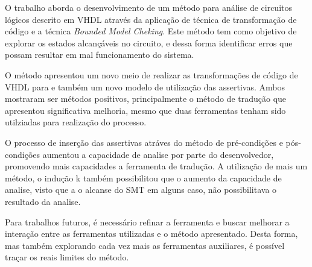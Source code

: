 \label{chapter:consideracoes}
O trabalho aborda o desenvolvimento de um método para análise de circuitos lógicos descrito em VHDL através da aplicação de técnica de transformação de código e a técnica \textit{Bounded Model Cheking}. Este método tem como objetivo de explorar os estados alcançáveis no circuito, e dessa forma identificar erros que possam resultar em mal funcionamento do sistema.

\par
O método apresentou um novo meio de realizar as transformações de código de VHDL para e também um novo modelo de utilização das assertivas. Ambos mostraram ser métodos positivos, principalmente o método de tradução que apresentou significativa melhoria, mesmo que duas ferramentas tenham sido utilziadas para realização do processo.

\par
O processo de inserção das assertivas atráves do método de pré-condições e pós-condições aumentou a capacidade de analise por parte do desenvolvedor, promovendo mais capacidades a ferramenta de tradução. A utilização de mais um método, o indução k também possibilitou que o aumento da capacidade de analise, visto que a o alcanse do SMT em alguns caso, não possibilitava o resultado da analise.

\par
Para trabalhos futuros, é necessário refinar a ferramenta e buscar melhorar a interação entre as ferramentas utilizadas e o método apresentado. Desta forma, mas também explorando cada vez mais as ferramentas auxiliares, é possível traçar os reais limites do método.

\par

 